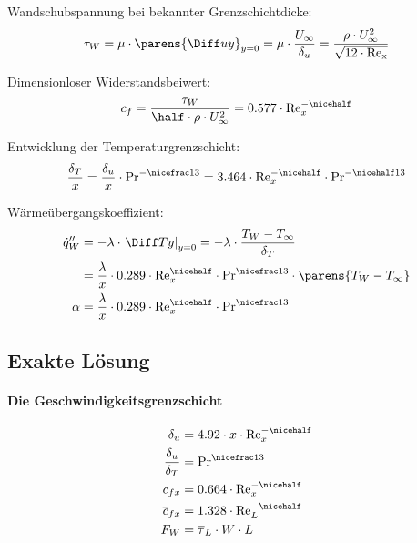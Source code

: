 			Wandschubspannung bei bekannter Grenzschichtdicke:
			\[
				\tau_W = \mu \cdot \parens{\Diff u y}_{y=0} = \mu \cdot \frac{U_\infty}{\delta_u} = \frac{\rho \cdot U_\infty^2}{\sqrt{12 \cdot \mathrm{Re_x}}}
			\]

			Dimensionloser Widerstandsbeiwert:
			\[
				c_f = \frac{\tau_W}{\half \cdot \rho \cdot U_\infty^2} = 0.577 \cdot \mathrm{Re}_x^{-\nicehalf}
			\]

			Entwicklung der Temperaturgrenzschicht:
			\[
				\frac{\delta_T}{x} = \frac{\delta_u}{x} \cdot \mathrm{Pr}^{-\nicefrac 1 3} = 3.464 \cdot \mathrm{Re}_x^{-\nicehalf} \cdot \mathrm{Pr}^{-\nicehalf 1 3}
			\]

			Wärmeübergangskoeffizient:
			\begin{align*}
				\dot q_W'' &= -\lambda \cdot \left. \Diff T y \right|_{y=0} = - \lambda \cdot \frac{T_W - T_\infty}{\delta_T} \\
				&= \frac \lambda x \cdot 0.289 \cdot \mathrm{Re}_x^{\nicehalf} \cdot \mathrm{Pr}^{\nicefrac 1 3} \cdot \parens{T_W - T_\infty} \\
				\alpha &= \frac \lambda x \cdot 0.289 \cdot \mathrm{Re}_x^{\nicehalf} \cdot \mathrm{Pr}^{\nicefrac 1 3}
			\end{align*}

	\subsection{Exakte Lösung} %
		\paragraph{Die Geschwindigkeitsgrenzschicht} %
			\begin{align*}
				\delta_u &= 4.92 \cdot x \cdot \mathrm{Re}_x^{-\nicehalf} \\
				\frac{\delta_u}{\delta_T} &= \mathrm{Pr}^{\nicefrac 1 3} \\
				c_{fx} &= 0.664 \cdot \mathrm{Re}_x^{-\nicehalf} \\
				\overline c_{fx} &= 1.328 \cdot \mathrm{Re}_L^{-\nicehalf} \\
				F_W &= \overline\tau_L \cdot W \cdot L
			\end{align*}

